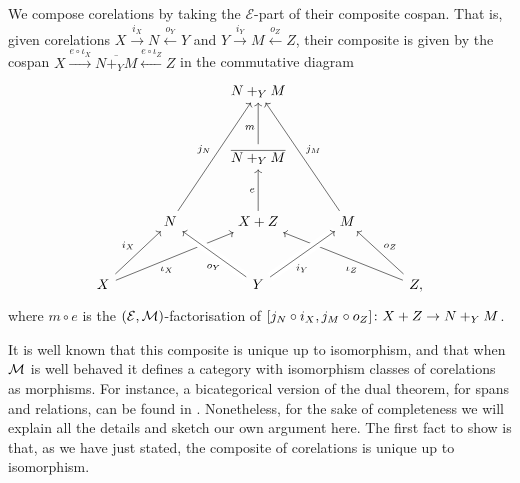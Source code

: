 We compose corelations by taking the $\mathcal E$-part of their composite
cospan. That is, given corelations $X \stackrel{i_X}{\longrightarrow} N
\stackrel{o_Y}{\longleftarrow} Y$ and $Y \stackrel{i_Y}{\longrightarrow} M
\stackrel{o_Z}{\longleftarrow} Z$, their composite is given by the cospan $X
\xrightarrow{e\circ\iota_X} \overline{N+_YM} \xleftarrow{e \circ \iota_Z} Z$ in the commutative diagram
\[
  \begin{tikzcd}[row sep=7ex,column sep=7ex]
    && N+_YM \\
    && \overline{N+_YM} \arrow[u,pos=.4,"m"] \\
    & N \arrow[uur,"j_N"] & X+Z \arrow[from=dll,pos=.35,swap,"\iota_X"]
    \arrow[from=drr,pos=.35,"\iota_Z"]
    \arrow[u,"e"] & 
    M \arrow[uul,swap,"j_M"] \\
    X \arrow[ur,"i_X"] && Y
    \arrow[ul,crossing over,pos=.35,"o_Y"] \arrow[ur,crossing
    over,pos=.35,swap,"i_Y"] && Z,
    \arrow[ul,swap,"o_Z"]
  \end{tikzcd}
\]
where $m \circ e$ is the $(\mathcal E,\mathcal M)$-factorisation of $[j_N\circ i_X,j_M
\circ o_Z]{\colon} X+Z
\to N+_YM$. 

It is well known that this composite is unique up to isomorphism, and that when
$\mathcal M$ is well behaved it defines a category with isomorphism classes of
corelations as morphisms. For instance, a bicategorical version of the dual
theorem, for spans and relations, can be found in \cite{JW00}. Nonetheless, for
the sake of completeness we will explain all the details and sketch our own
argument here. The first fact to show is that, as we have just stated, the
composite of corelations is unique up to isomorphism.

